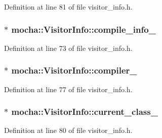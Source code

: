 Definition at line 81 of file visitor\_\-info.h.

\hypertarget{classmocha_1_1_visitor_info_a30b15b6a4c17f03d24275ada6300433e}{
\subsubsection[{compile\_\-info\_\-}]{$\ast$ {\bf mocha::VisitorInfo::compile\_\-info\_\-}}}
\label{classmocha_1_1_visitor_info_a30b15b6a4c17f03d24275ada6300433e}


Definition at line 73 of file visitor\_\-info.h.

\hypertarget{classmocha_1_1_visitor_info_a91d1119b49e7bd820bd36f6c7011acfe}{
\subsubsection[{compiler\_\-}]{$\ast$ {\bf mocha::VisitorInfo::compiler\_\-}}}
\label{classmocha_1_1_visitor_info_a91d1119b49e7bd820bd36f6c7011acfe}


Definition at line 77 of file visitor\_\-info.h.

\hypertarget{classmocha_1_1_visitor_info_a2f5865d4e0ef494c7792ddb796bf3196}{
\subsubsection[{current\_\-class\_\-}]{$\ast$ {\bf mocha::VisitorInfo::current\_\-class\_\-}}}
\label{classmocha_1_1_visitor_info_a2f5865d4e0ef494c7792ddb796bf3196}


Definition at line 80 of file visitor\_\-info.h.

